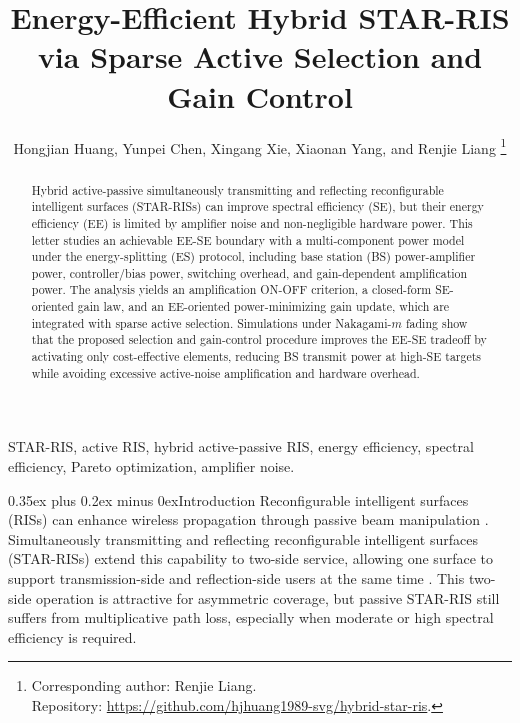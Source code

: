 \documentclass[journal]{IEEEtran}
\makeatletter
\def\section{\@startsection{section}{1}{\z@}{1.2ex plus 0.4ex minus 0.2ex}%
{0.35ex plus 0.2ex minus 0ex}{\normalfont\normalsize\centering\scshape}}%
\makeatother
\begin{document}
\title{Energy-Efficient Hybrid STAR-RIS via Sparse Active Selection and Gain Control}

\author{Hongjian Huang, Yunpei Chen, Xingang Xie, Xiaonan Yang, and Renjie Liang%
\thanks{Corresponding author: Renjie Liang.\protect\\
Repository: \url{https://github.com/hjhuang1989-svg/hybrid-star-ris}.}}
\maketitle


\begin{abstract}
Hybrid active-passive simultaneously transmitting and reflecting reconfigurable intelligent surfaces (STAR-RISs) can improve spectral efficiency (SE), but their energy efficiency (EE) is limited by amplifier noise and non-negligible hardware power. This letter studies an achievable EE-SE boundary with a multi-component power model under the energy-splitting (ES) protocol, including base station (BS) power-amplifier power, controller/bias power, switching overhead, and gain-dependent amplification power. The analysis yields an amplification ON-OFF criterion, a closed-form SE-oriented gain law, and an EE-oriented power-minimizing gain update, which are integrated with sparse active selection. Simulations under Nakagami-$m$ fading show that the proposed selection and gain-control procedure improves the EE-SE tradeoff by activating only cost-effective elements, reducing BS transmit power at high-SE targets while avoiding excessive active-noise amplification and hardware overhead.
\end{abstract}

\begin{IEEEkeywords}
STAR-RIS, active RIS, hybrid active-passive RIS, energy efficiency, spectral efficiency, Pareto optimization, amplifier noise.
\end{IEEEkeywords}


\section{Introduction}
Reconfigurable intelligent surfaces (RISs) can enhance wireless propagation through passive beam manipulation \cite{wu2019irs,bjornson2020myths,bjornson2022signalperspective}. Simultaneously transmitting and reflecting reconfigurable intelligent surfaces (STAR-RISs) extend this capability to two-side service, allowing one surface to support transmission-side and reflection-side users at the same time \cite{liu2021star,mu2022star}. This two-side operation is attractive for asymmetric coverage, but passive STAR-RIS still suffers from multiplicative path loss, especially when moderate or high spectral efficiency is required.
\end{document}

